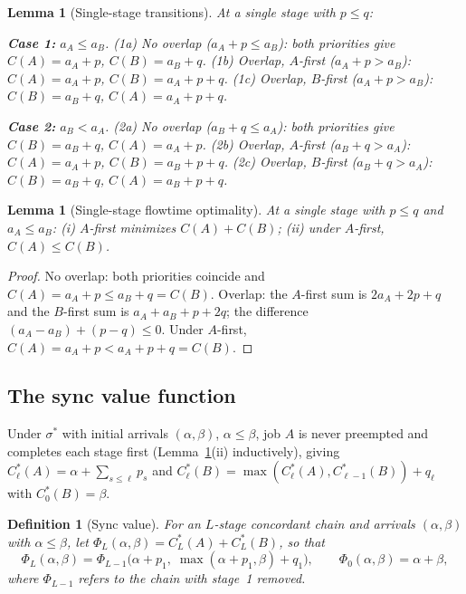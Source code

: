 \documentclass[sn-mathphys,NameDate]{sn-jnl}
\theoremstyle{thmstyleone}
\newtheorem{lemma}[theorem]{Lemma}
\theoremstyle{thmstylethree}
\newtheorem{definition}[theorem]{Definition}
\theoremstyle{thmstyletwo}
\begin{document}
\begin{lemma}[Single-stage transitions]
\label{lem:transitions}
At a single stage with $p \leq q$:

\smallskip\noindent
\textbf{Case 1:} $a_A \leq a_B$.
\emph{(1a) No overlap} ($a_A + p \leq a_B$): both priorities
give $C(A) = a_A + p$, $C(B) = a_B + q$.
\emph{(1b) Overlap, $A$-first} ($a_A + p > a_B$):
$C(A) = a_A + p$, $C(B) = a_A + p + q$.
\emph{(1c) Overlap, $B$-first} ($a_A + p > a_B$):
$C(B) = a_B + q$, $C(A) = a_A + p + q$.

\smallskip\noindent
\textbf{Case 2:} $a_B < a_A$.
\emph{(2a) No overlap} ($a_B + q \leq a_A$): both priorities
give $C(B) = a_B + q$, $C(A) = a_A + p$.
\emph{(2b) Overlap, $A$-first} ($a_B + q > a_A$):
$C(A) = a_A + p$, $C(B) = a_B + p + q$.
\emph{(2c) Overlap, $B$-first} ($a_B + q > a_A$):
$C(B) = a_B + q$, $C(A) = a_B + p + q$.
\end{lemma}

\begin{lemma}[Single-stage flowtime optimality]
\label{lem:single-stage}
At a single stage with $p \leq q$ and $a_A \leq a_B$:
\textup{(i)} $A$-first minimizes $C(A) + C(B)$;
\textup{(ii)} under $A$-first, $C(A) \leq C(B)$.
\end{lemma}

\begin{proof}
No overlap: both priorities coincide and
$C(A) = a_A + p \leq a_B + q = C(B)$. Overlap: the $A$-first
sum is $2a_A + 2p + q$ and the $B$-first sum is
$a_A + a_B + p + 2q$; the difference
$(a_A - a_B) + (p - q) \leq 0$. Under $A$-first,
$C(A) = a_A + p < a_A + p + q = C(B)$.
\end{proof}

\subsection{The sync value function}

Under $\sigma^*$ with initial arrivals $(\alpha, \beta)$,
$\alpha \leq \beta$, job $A$ is never preempted and completes
each stage first (Lemma~\ref{lem:single-stage}(ii)
inductively), giving
$C_\ell^*(A) = \alpha + \sum_{s \leq \ell} p_s$ and
$C_\ell^*(B) = \max(C_\ell^*(A), C_{\ell-1}^*(B)) + q_\ell$
with $C_0^*(B) = \beta$.

\begin{definition}[Sync value]
\label{def:Phi}
For an $L$-stage concordant chain and arrivals
$(\alpha, \beta)$ with $\alpha \leq \beta$, let
$\Phi_L(\alpha, \beta) = C_L^*(A) + C_L^*(B)$, so that
\[
  \Phi_L(\alpha, \beta)
  = \Phi_{L-1}\bigl(\alpha + p_1,\;
    \max(\alpha + p_1, \beta) + q_1\bigr),
  \qquad
  \Phi_0(\alpha, \beta) = \alpha + \beta ,
\]
where $\Phi_{L-1}$ refers to the chain with stage~1 removed.
\end{definition}
\end{document}
